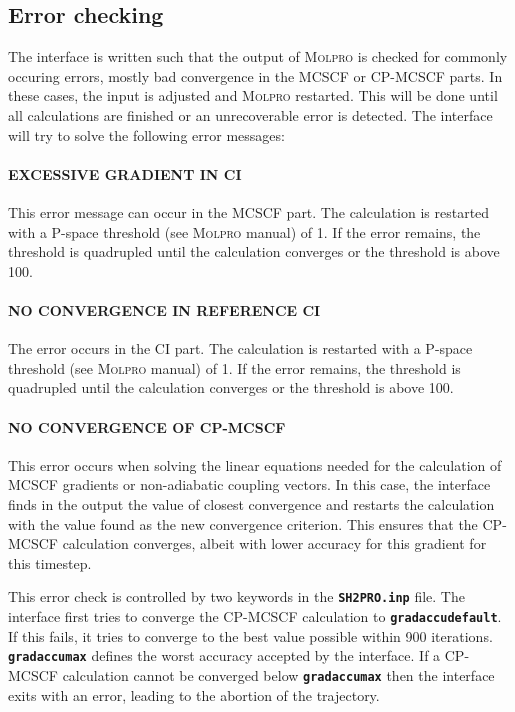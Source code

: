\documentclass[a4paper,11pt,DIV=15,openany,twoside=false]{scrbook}
\newcommand{\ttt}[1]{\textbf{\texttt{#1}}}
\begin{document}
\subsection{Error checking}

The interface is written such that the output of \textsc{Molpro} is checked for commonly occuring errors, mostly bad convergence in the MCSCF or CP-MCSCF parts. In these cases, the input is adjusted and \textsc{Molpro} restarted. This will be done until all calculations are finished or an unrecoverable error is detected.
The interface will try to solve the following error messages:

\paragraph{EXCESSIVE GRADIENT IN CI} This error message can occur in the MCSCF part. The calculation is restarted with a P-space threshold (see \textsc{Molpro} manual) of 1. If the error remains, the threshold is quadrupled until the calculation converges or the threshold is above 100.

\paragraph{NO CONVERGENCE IN REFERENCE CI} The error occurs in the CI part. The calculation is restarted with a P-space threshold (see \textsc{Molpro} manual) of 1. If the error remains, the threshold is quadrupled until the calculation converges or the threshold is above 100.

\paragraph{NO CONVERGENCE OF CP-MCSCF} This error occurs when solving the linear equations needed for the calculation of MCSCF gradients or non-adiabatic coupling vectors. In this case, the interface finds in the output the value of closest convergence and restarts the calculation with the value found as the new convergence criterion. This ensures that the CP-MCSCF calculation converges, albeit with lower accuracy for this gradient for this timestep.

This error check is controlled by two keywords in the \ttt{SH2PRO.inp} file. The interface first tries to converge the CP-MCSCF calculation to \ttt{gradaccudefault}. If this fails, it tries to converge to the best value possible within 900 iterations. \ttt{gradaccumax} defines the worst accuracy accepted by the interface. If a CP-MCSCF calculation cannot be converged below \ttt{gradaccumax} then the interface exits with an error, leading to the abortion of the trajectory.
\end{document}
